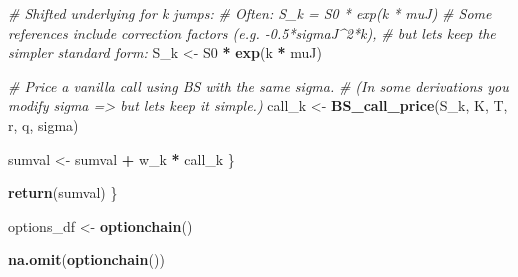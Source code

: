 \documentclass[
]{article}
\newenvironment{Shaded}{\begin{snugshade}}{\end{snugshade}}
\newcommand{\CommentTok}[1]{\textcolor[rgb]{0.56,0.35,0.01}{\textit{#1}}}
\newcommand{\FunctionTok}[1]{\textcolor[rgb]{0.13,0.29,0.53}{\textbf{#1}}}
\newcommand{\NormalTok}[1]{#1}
\newcommand{\OtherTok}[1]{\textcolor[rgb]{0.56,0.35,0.01}{#1}}
\newcommand{\SpecialCharTok}[1]{\textcolor[rgb]{0.81,0.36,0.00}{\textbf{#1}}}
\begin{document}
\begin{Shaded}
\begin{Highlighting}[]
    \CommentTok{\# Shifted underlying for k jumps:}
    \CommentTok{\# Often: S\_k = S0 * exp(k * muJ)}
    \CommentTok{\# Some references include correction factors (e.g. {-}0.5*sigmaJ\^{}2*k),}
    \CommentTok{\# but let\textquotesingle{}s keep the simpler standard form:}
\NormalTok{    S\_k }\OtherTok{\textless{}{-}}\NormalTok{ S0 }\SpecialCharTok{*} \FunctionTok{exp}\NormalTok{(k }\SpecialCharTok{*}\NormalTok{ muJ)}
    
    \CommentTok{\# Price a vanilla call using BS with the same sigma. }
    \CommentTok{\# (In some derivations you modify sigma =\textgreater{} but let\textquotesingle{}s keep it simple.)}
\NormalTok{    call\_k }\OtherTok{\textless{}{-}} \FunctionTok{BS\_call\_price}\NormalTok{(S\_k, K, T, r, q, sigma)}
    
\NormalTok{    sumval }\OtherTok{\textless{}{-}}\NormalTok{ sumval }\SpecialCharTok{+}\NormalTok{ w\_k }\SpecialCharTok{*}\NormalTok{ call\_k}
\NormalTok{  \}}
  
  \FunctionTok{return}\NormalTok{(sumval)}
\NormalTok{\}}
\end{Highlighting}
\end{Shaded}

\begin{Shaded}
\begin{Highlighting}[]
\NormalTok{options\_df }\OtherTok{\textless{}{-}} \FunctionTok{optionchain}\NormalTok{()}


\FunctionTok{na.omit}\NormalTok{(}\FunctionTok{optionchain}\NormalTok{())}
\end{Highlighting}
\end{Shaded}
\end{document}
